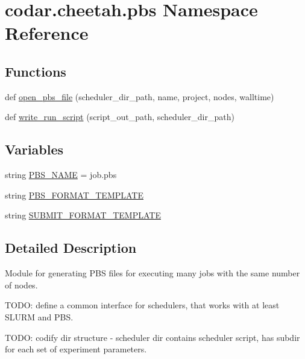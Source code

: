 \hypertarget{namespacecodar_1_1cheetah_1_1pbs}{}\section{codar.\+cheetah.\+pbs Namespace Reference}
\label{namespacecodar_1_1cheetah_1_1pbs}
\subsection*{Functions}
\begin{DoxyCompactItemize}
\item 
def \hyperlink{namespacecodar_1_1cheetah_1_1pbs_a2d1652f1349a664f93598c2ea3c20896}{open\+\_\+pbs\+\_\+file} (scheduler\+\_\+dir\+\_\+path, name, project, nodes, walltime)
\item 
def \hyperlink{namespacecodar_1_1cheetah_1_1pbs_a911aa8a83bd8b0fd8f750ea66d410851}{write\+\_\+run\+\_\+script} (script\+\_\+out\+\_\+path, scheduler\+\_\+dir\+\_\+path)
\end{DoxyCompactItemize}
\subsection*{Variables}
\begin{DoxyCompactItemize}
\item 
string \hyperlink{namespacecodar_1_1cheetah_1_1pbs_a19167ffbdc5b9b468b3368c09ba8fe1f}{P\+B\+S\+\_\+\+N\+A\+ME} = \textquotesingle{}job.\+pbs\textquotesingle{}
\item 
string \hyperlink{namespacecodar_1_1cheetah_1_1pbs_a076dd2388cec6ba878adff6363356c1f}{P\+B\+S\+\_\+\+F\+O\+R\+M\+A\+T\+\_\+\+T\+E\+M\+P\+L\+A\+TE}
\item 
string \hyperlink{namespacecodar_1_1cheetah_1_1pbs_af0456cd6c62ec9db8b9fdfafc248b940}{S\+U\+B\+M\+I\+T\+\_\+\+F\+O\+R\+M\+A\+T\+\_\+\+T\+E\+M\+P\+L\+A\+TE}
\end{DoxyCompactItemize}


\subsection{Detailed Description}
\begin{DoxyVerb}Module for generating PBS files for executing many jobs with the same
number of nodes.

TODO: define a common interface for schedulers, that works with at least
SLURM and PBS.

TODO: codify dir structure - scheduler dir contains scheduler script, has
subdir for each set of experiment parameters.
\end{DoxyVerb}
 

